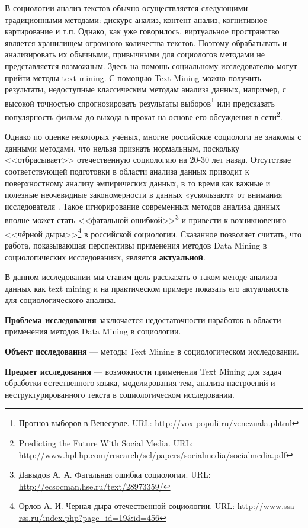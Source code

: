 В социологии анализ текстов обычно осуществляется следующими традиционными методами: дискурс-анализ,  контент-анализ, когнитивное картирование и т.п. Однако, как уже говорилось, виртуальное пространство является хранилищем огромного количества текстов. Поэтому обрабатывать и анализировать их обычными, привычными для социологов методами не  представляется возможным. Здесь на помощь социальному исследователю могут прийти методы text mining. С помощью Text Mining можно получить результаты, недоступные классическим методам анализа данных, например, с высокой точностью спрогнозировать результаты выборов\footnote{Прогноз выборов в Венесуэле. URL: \url{http://vox-populi.ru/venezuala.phtml}} или предсказать популярность фильма до выхода в прокат на основе его обсуждения в сети\footnote{Predicting the Future With Social Media. URL: \url{http://www.hpl.hp.com/research/scl/papers/socialmedia/socialmedia.pdf}}. 

Однако по оценке некоторых учёных, многие российские социологи не знакомы с данными методами, что нельзя признать нормальным, поскольку <<отбрасывает>> отечественную социологию на 20-30 лет назад. Отсутствие соответствующей подготовки в области анализа данных приводит к поверхностному анализу эмпирических данных, в то время как важные и полезные неочевидные закономерности в данных «ускользают» от внимания исследователя \cite{Davydov_Knowledge}. Такое игнорирование современных методов анализа данных вполне может стать <<фатальной ошибкой>>\footnote{Давыдов А. А. Фатальная ошибка социологии. URL: \url{http://ecsocman.hse.ru/text/28973359/}}  и привести к возникновению <<чёрной дыры>>\footnote{Орлов А. И. Черная дыра отечественной социологии. URL: \url{http://www.ssa-rss.ru/index.php?page_id=19&id=456}} в российской социологии. Сказанное позволяет считать, что работа, показывающая перспективы применения методов Data Mining в социологических исследованиях, является \textbf{актуальной}.

В данном исследовании мы ставим цель рассказать о таком методе анализа данных как text mining и на практическом примере показать его актуальность для социологического анализа.

\textbf{Проблема исследования} заключается недостаточности наработок в области применения методов Data Mining в социологии.

\textbf{Объект исследования} --- методы Text Mining в социологическом исследовании.

\textbf{Предмет исследования} --- возможности применения Text Mining для задач обработки естественного языка, моделирования тем, анализа настроений и неструктурированного текста в социологическом исследовании.
\clearpage